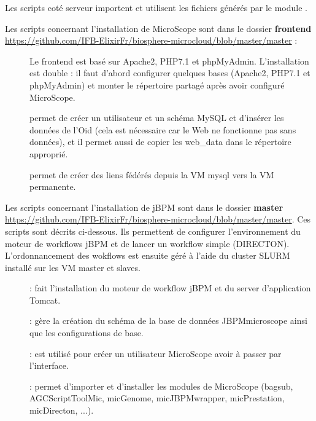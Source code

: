 Les scripts coté serveur importent et utilisent les fichiers générés par le module \micWEBdeployVer.
\bigskip

Les scripts concernant l'installation de MicroScope sont dans le dossier \textbf{frontend} \url{https://github.com/IFB-ElixirFr/biosphere-microcloud/blob/master/master} :
\begin{description}
    \item[] Le frontend est basé sur Apache2, PHP7.1 et phpMyAdmin. L'installation est double : il faut d'abord configurer quelques bases (Apache2, PHP7.1 et phpMyAdmin) et monter le répertoire partagé après avoir configuré MicroScope.
    \item[] permet de créer un utilisateur et un schéma MySQL et d'insérer les données de l'Oid \theOid{} (cela est nécessaire car le Web ne fonctionne pas sans données), et il permet aussi de copier les web\_data dans le répertoire approprié.
    \item[] permet de créer des liens fédérés depuis la VM mysql vers la VM permanente.
\end{description}
\bigskip

Les scripts concernant l'installation de jBPM sont dans le dossier \textbf{master} \url{https://github.com/IFB-ElixirFr/biosphere-microcloud/blob/master/master}. Ces scripts sont décrits ci-dessous. Ils permettent de configurer l'environnement du moteur de workflows jBPM et de lancer un workflow simple (DIRECTON). L'ordonnancement des wokflows est ensuite géré à l'aide du cluster SLURM installé sur les VM master et slaves.

\begin{description}
    \item[] : fait l'installation du moteur de workflow jBPM et du server d'application Tomcat.
    \item[] : gère la création du schéma de la base de données JBPMmicroscope ainsi que les configurations de base.
    \item[] : est utilisé pour créer un utilisateur MicroScope avoir à passer par l'interface.
    \item[] : permet d'importer et d'installer les modules de MicroScope (bagsub, AGCScriptToolMic, micGenome, micJBPMwrapper, micPrestation, micDirecton, ...).
\end{description}

